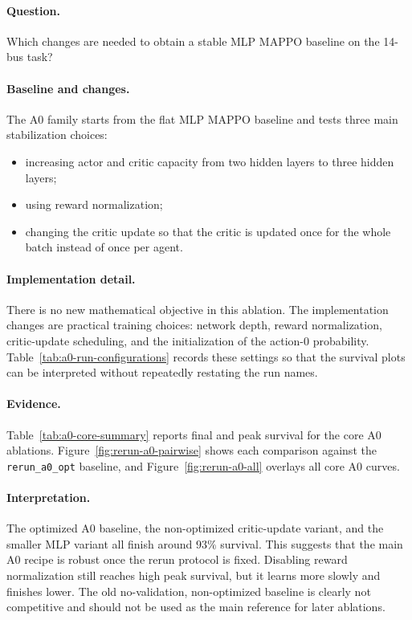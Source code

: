 \paragraph{Question.}
Which changes are needed to obtain a stable MLP MAPPO baseline on the 14-bus
task?

\paragraph{Baseline and changes.}
The A0 family starts from the flat MLP MAPPO baseline and tests three main
stabilization choices:

\begin{itemize}
  \item increasing actor and critic capacity from two hidden layers to three
  hidden layers;
  \item using reward normalization;
  \item changing the critic update so that the critic is updated once for the
  whole batch instead of once per agent.
\end{itemize}

\paragraph{Implementation detail.}
There is no new mathematical objective in this ablation. The implementation
changes are practical training choices: network depth, reward normalization,
critic-update scheduling, and the initialization of the action-0 probability.
Table~\ref{tab:a0-run-configurations} records these settings so that the
survival plots can be interpreted without repeatedly restating the run names.

\paragraph{Evidence.}
Table~\ref{tab:a0-core-summary} reports final and peak survival for the core A0
ablations. Figure~\ref{fig:rerun-a0-pairwise} shows each comparison against the
\texttt{rerun\_a0\_opt} baseline, and Figure~\ref{fig:rerun-a0-all} overlays all
core A0 curves.

\paragraph{Interpretation.}
The optimized A0 baseline, the non-optimized critic-update variant, and the
smaller MLP variant all finish around \(93\%\) survival. This suggests that the
main A0 recipe is robust once the rerun protocol is fixed. Disabling reward
normalization still reaches high peak survival, but it learns more slowly and
finishes lower. The old no-validation, non-optimized baseline is clearly not
competitive and should not be used as the main reference for later ablations.


